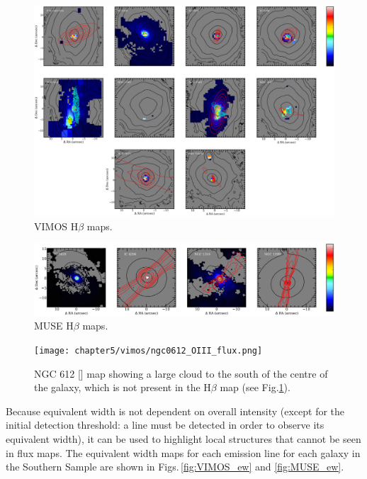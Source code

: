 		\begin{figure}
			\centering
			\includegraphics[width=\textwidth]{chapter5/vimos/Hb.png}
			\caption[VIMOS H$\beta$ maps]{VIMOS H$\beta$ maps.} 
			\label{fig:VIMOS_Hb}
		\end{figure}
		\begin{figure}
			\centering
			\includegraphics[width=\textwidth]{chapter5/muse/Hb.png}
			\caption[MUSE H$\beta$ maps]{MUSE H$\beta$ maps.} 
			\label{fig:MUSE_Hb}
		\end{figure}


		\begin{figure}
			\centering
			\texttt{[image: chapter5/vimos/ngc0612\_OIII\_flux.png]}
			\caption[NGC 612  image]{NGC 612 [] map showing a large cloud to the south of the centre of the galaxy, which is not present in the H$\beta$ map (see Fig.\ref{fig:VIMOS_Hb}).} 
			\label{fig:NGC612_OIII}
		\end{figure}


		Because equivalent width is not dependent on overall intensity (except for the initial detection threshold: a line must be detected in order to observe its equivalent width), it can be used to highlight local structures that cannot be seen in flux maps. The equivalent width maps for each emission line for each galaxy in the Southern Sample are shown in Figs.\,\ref{fig:VIMOS_ew} and \ref{fig:MUSE_ew}. 

